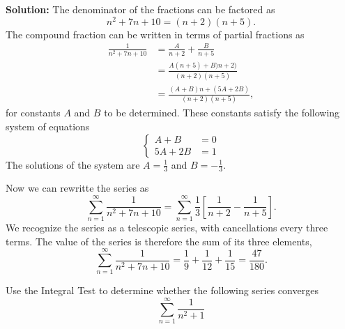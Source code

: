 \documentclass[11pt]{exam}
\begin{document}
\begin{questions}

\textbf{Solution:} The denominator of the fractions can be factored as 
\begin{equation*}
n^2+7n+10 =(n+2)(n+5).
\end{equation*}
The compound fraction can be written in terms of partial fractions as 
\begin{align*}
\frac{1}{n^2+7n+10} & =\frac{A}{n+2} + \frac{B}{n+5}\\
& = \frac{A(n+5)+B)n+2)}{(n+2)(n+5)}\\
& = \frac{(A+B)n+(5A+2B)}{(n+2)(n+5)},
\end{align*}
for constants $A$ and $B$ to be determined. These constants satisfy the following system of equations
\begin{equation*}
\left\{
\begin{array}{rl}
A + B & = 0\\
5A+2B & = 1
\end{array}
\right.
\end{equation*}
The solutions of the system are $A=\frac{1}{3}$ and $B=-\frac{1}{3}$. 

Now we can rewritte the series as 
\begin{equation*}
\sum_{n=1}^{\infty} \frac{1}{n^2+7n+10} = \sum_{n=1}^{\infty} \frac{1}{3}\left[ \frac{1}{n+2} - \frac{1}{n+5} \right].
\end{equation*}
We recognize the series as a telescopic series, with cancellations every three terms. The value of the series is therefore the sum of its three elements, 
\begin{equation*}
\sum_{n=1}^{\infty} \frac{1}{n^2+7n+10} = \frac{1}{9}+\frac{1}{12}+\frac{1}{15} = \frac{47}{180}.
\end{equation*}


\newpage
\addpoints
\question[2] Use the Integral Test to determine whether the following series converges
\begin{equation*}
\sum_{n=1}^{\infty} \frac{1}{n^2+1}
\end{equation*}


\end{questions}
\end{document}
